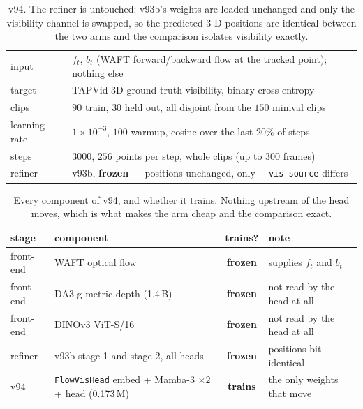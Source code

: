 \documentclass[11pt,a4paper]{article}
\begin{document}
\begin{table}[h]
\centering
\caption{v94. The refiner is untouched: v93b's weights are loaded unchanged and only the
visibility channel is swapped, so the predicted 3-D positions are identical between the two
arms and the comparison isolates visibility exactly.}
\label{tab:v94-protocol}
\begin{tabular}{ll}
\toprule
input & $f_t$, $b_t$ (WAFT forward/backward flow at the tracked point); nothing else \\
target & TAPVid-3D ground-truth visibility, binary cross-entropy \\
clips & $90$ train, $30$ held out, all disjoint from the $150$ minival clips \\
learning rate & $1\times10^{-3}$, $100$ warmup, cosine over the last $20\%$ of steps \\
steps & $3000$, $256$ points per step, whole clips (up to $300$ frames) \\
refiner & v93b, \textbf{frozen} --- positions unchanged, only \texttt{-{}-vis-source} differs \\
\bottomrule
\end{tabular}
\end{table}

\begin{table}[h]
\centering
\caption{Every component of v94, and whether it trains. Nothing upstream of the head moves,
which is what makes the arm cheap and the comparison exact.}
\label{tab:v94-freeze}
\begin{tabular}{llcl}
\toprule
stage & component & trains? & note \\
\midrule
front-end & WAFT optical flow & \textbf{frozen} & supplies $f_t$ and $b_t$ \\
front-end & DA3-g metric depth (1.4\,B) & \textbf{frozen} & not read by the head at all \\
front-end & DINOv3 ViT-S/16 & \textbf{frozen} & not read by the head at all \\
\midrule
refiner & v93b stage 1 and stage 2, all heads & \textbf{frozen} & positions bit-identical \\
\midrule
v94 & \texttt{FlowVisHead} embed + Mamba-3 $\times2$ + head (0.173\,M) & \textbf{trains} & the only weights that move \\
\bottomrule
\end{tabular}
\end{table}
\end{document}
